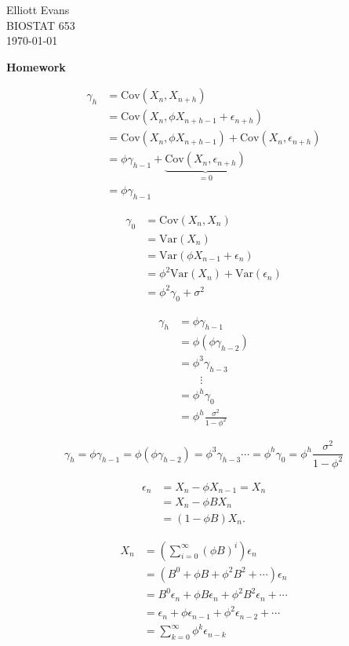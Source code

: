 \documentclass[12pt,letterpaper]{article}
\newcommand{\var}{\text{Var}}
\newcommand{\cov}{\text{Cov}}
\begin{document}
\begin{flushright}
Elliott Evans\\ BIOSTAT 653\\ \today
\end{flushright}

\begin{center}
\LARGE{\textbf{Homework}}
\end{center}

\begin{align*}
\gamma_h &= \cov(X_n,X_{n+h})\\
		 &=\cov(X_n,\phi X_{n+h-1} + \epsilon_{n+h})\\
		 &=\cov(X_n,\phi X_{n+h-1}) + \cov(X_n,\epsilon_{n+h})\\
		 &=\phi\gamma_{h-1} + \underbrace{\cov(X_n,\epsilon_{n+h})}_{=0}\\
		 &=\phi\gamma_{h-1}
\end{align*}

\begin{align*}
\gamma_0 &= \cov(X_n,X_n)\\
		 &=\var(X_n)\\
		 &=\var(\phi X_{n-1} + \epsilon_n)\\
		 &=\phi^2\var(X_n) + \var(\epsilon_n)\\
		 &=\phi^2\gamma_0 + \sigma^2
\end{align*}

\begin{align*}
\gamma_h &= \phi\gamma_{h-1}\\
		 &=\phi(\phi\gamma_{h-2})\\
		 &=\phi^3\gamma_{h-3}\\
		 &\qquad \vdots \\
		 &=\phi^h\gamma_0\\
		 &=\phi^h\frac{\sigma^2}{1-\phi^2}
\end{align*}

$$\gamma_h = \phi\gamma_{h-1}
=\phi(\phi\gamma_{h-2})
=\phi^3\gamma_{h-3}
 \cdots 
=\phi^h\gamma_0
=\phi^h\frac{\sigma^2}{1-\phi^2}$$


\begin{align*}
\epsilon_n &= X_n - \phi X_{n-1}=X_n\\
		   &= X_n - \phi BX_n\\
		   &=(1-\phi B)X_n.
\end{align*}

\begin{align*}
X_n &= \left(\sum_{i=0}^\infty (\phi B)^i\right)\epsilon_n\\
    &=(B^0 + \phi B + \phi^2 B^2 + \cdots)\epsilon_n\\
    &=B^0\epsilon_n + \phi B\epsilon_n + \phi^2 B^2\epsilon_n + \cdots\\
    &=\epsilon_n + \phi\epsilon_{n-1} + \phi^2\epsilon_{n-2} + \cdots\\
    &=\sum_{k=0}^\infty \phi^k\epsilon_{n-k}
\end{align*}
\end{document}
